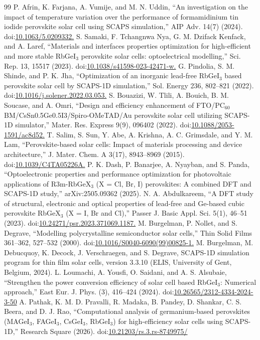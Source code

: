 \documentclass[review]{elsarticle}
\begin{document}
\begin{thebibliography}{99}
 P. Afrin, K. Farjana, A. Vumije, and M. N. Uddin, ``An investigation on the impact of temperature variation over the performance of formamidinium tin iodide perovskite solar cell using SCAPS simulation,'' AIP Adv. 14(7) (2024). doi:\url{10.1063/5.0209332.}
 S. Samaki, F. Tchangnwa Nya, G. M. Dzifack Kenfack, and A. Laref, ``Materials and interfaces properties optimization for high-efficient and more stable RbGeI$_{3}$ perovskite solar cells: optoelectrical modelling,'' Sci. Rep. 13, 15517 (2023). doi:\url{10.1038/s41598-023-42471-w.}
 G. Pindolia, S. M. Shinde, and P. K. Jha, ``Optimization of an inorganic lead-free RbGeI$_{3}$ based perovskite solar cell by SCAPS-1D simulation,'' Sol. Energy 236, 802--821 (2022). doi:\url{10.1016/j.solener.2022.03.053.}
 S. Bouazizi, W. Tlili, A. Bouich, B. M. Soucase, and A. Omri, ``Design and efficiency enhancement of FTO/\allowbreak{}PC$_{60}$BM/CsSn0.5Ge0.5I3/\allowbreak{}Spiro-OMeTAD/\allowbreak{}Au perovskite solar cell utilizing SCAPS-1D simulator,'' Mater. Res. Express 9(9), 096402 (2022). doi:\url{10.1088/2053-1591/ac8d52.}
 T. Salim, S. Sun, Y. Abe, A. Krishna, A. C. Grimsdale, and Y. M. Lam, ``Perovskite-based solar cells: Impact of materials processing and device architecture,'' J. Mater. Chem. A 3(17), 8943--8969 (2015). doi:\url{10.1039/C4TA05226A.}
 P. K. Dash, P. Banarjee, A. Nyayban, and S. Panda, ``Optoelectronic properties and performance optimization for photovoltaic applications of R3m-RbGeX$_{3}$ (X = Cl, Br, I) perovskites: A combined DFT and SCAPS-1D study,'' arXiv:2505.09362 (2025).
 N. A. Abdulkareem, ``A DFT study of structural, electronic and optical properties of lead-free and Ge-based cubic perovskite RbGeX$_{3}$ (X = I, Br and Cl),'' Passer J. Basic Appl. Sci. 5(1), 46--51 (2023). doi:\url{10.24271/psr.2023.371069.1187.}
 M. Burgelman, P. Nollet, and S. Degrave, ``Modelling polycrystalline semiconductor solar cells,'' Thin Solid Films 361--362, 527--532 (2000). doi:\url{10.1016/S0040-6090(99)00825-1.}
 M. Burgelman, M. Debucquoy, K. Decock, J. Verschraegen, and S. Degrave, SCAPS-1D simulation program for thin film solar cells, version 3.3.10 (ELIS, University of Gent, Belgium, 2024).
 L. Loumachi, A. Yousfi, O. Saidani, and A. S. Alsubaie, ``Strengthen the power conversion efficiency of solar cell based RbGeI$_{3}$: Numerical approach,'' East Eur. J. Phys. (3), 416--424 (2024). doi:\url{10.26565/2312-4334-2024-3-50}
 A. Pathak, K. M. D. Pravalli, R. Madaka, B. Pandey, D. Shankar, C. S. Beera, and D. J. Rao, ``Computational analysis of germanium-based perovskites (MAGeI$_{3}$, FAGeI$_{3}$, CsGeI$_{3}$, RbGeI$_{3}$) for high-efficiency solar cells using SCAPS-1D,'' Research Square (2026). doi:\url{10.21203/rs.3.rs-8749975/}

\end{thebibliography}
\end{document}
